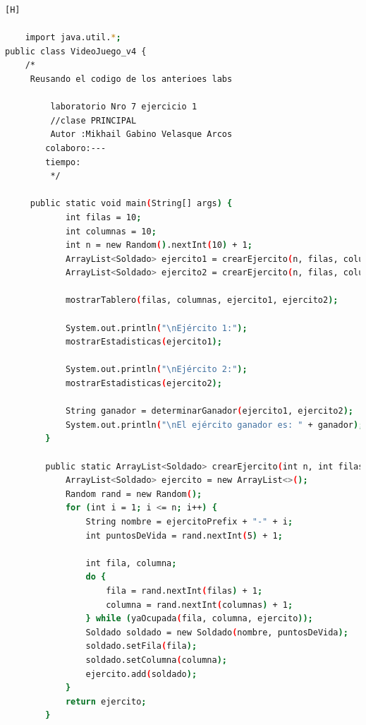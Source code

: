 \documentclass{article}
\begin{document}
	\begin{lstlisting}[language=bash,caption={Creando la clase principal de VideoJuego_v4.java}][H]
	
	import java.util.*;
public class VideoJuego_v4 {
	/*
	 Reusando el codigo de los anterioes labs
	
		 laboratorio Nro 7 ejercicio 1 
		 //clase PRINCIPAL
		 Autor :Mikhail Gabino Velasque Arcos
		colaboro:---	
		tiempo:
		 */

	 public static void main(String[] args) {
	        int filas = 10; 
	        int columnas = 10; 
	        int n = new Random().nextInt(10) + 1; 
	        ArrayList<Soldado> ejercito1 = crearEjercito(n, filas, columnas, "E1");
	        ArrayList<Soldado> ejercito2 = crearEjercito(n, filas, columnas, "E2");

	        mostrarTablero(filas, columnas, ejercito1, ejercito2);

	        System.out.println("\nEjército 1:");
	        mostrarEstadisticas(ejercito1);

	        System.out.println("\nEjército 2:");
	        mostrarEstadisticas(ejercito2);

	        String ganador = determinarGanador(ejercito1, ejercito2);
	        System.out.println("\nEl ejército ganador es: " + ganador);
	    }

	    public static ArrayList<Soldado> crearEjercito(int n, int filas, int columnas, String ejercitoPrefix) {
	        ArrayList<Soldado> ejercito = new ArrayList<>();
	        Random rand = new Random();
	        for (int i = 1; i <= n; i++) {
	            String nombre = ejercitoPrefix + "-" + i; 
	            int puntosDeVida = rand.nextInt(5) + 1; 

	            int fila, columna;
	            do {
	                fila = rand.nextInt(filas) + 1;
	                columna = rand.nextInt(columnas) + 1;
	            } while (yaOcupada(fila, columna, ejercito));
	            Soldado soldado = new Soldado(nombre, puntosDeVida);
	            soldado.setFila(fila);
	            soldado.setColumna(columna);
	            ejercito.add(soldado);
	        }
	        return ejercito;
	    }


\end{lstlisting}
\end{document}
